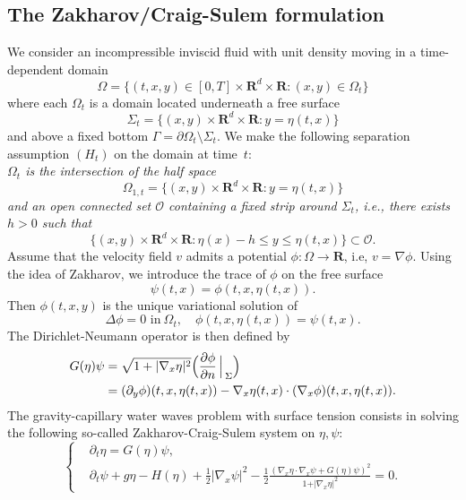 \documentclass[11pt,english]{smfart}
\theoremstyle{plain}
\theoremstyle{definition}
\numberwithin{equation}{section}
\begin{document}
\subsection{The Zakharov/Craig-Sulem formulation}
 We consider an incompressible inviscid fluid with unit density moving in a time-dependent domain  
$$
\Omega = \{(t,x,y) \in[0,T] \times {\mathbf{R}}^d \times {\mathbf{R}}:(x, y)\in \Omega_t\} 
$$
where each $\Omega_t$ is a domain located underneath a free surface 
$$
\Sigma_t = \{(x,y)  \times {\mathbf{R}}^d \times {\mathbf{R}}: y=\eta(t, x)\} 
$$
and above a fixed bottom $\Gamma=\partial\Omega_t\setminus \Sigma_t$. We make the following separation assumption $(H_t)$ on the  domain at time~$t$:\\
{\it
$\Omega_t$ is the intersection of the half space 
\[
\Omega_{1,t}= \{(x,y)  \times {\mathbf{R}}^d \times {\mathbf{R}}: y=\eta(t, x)\} 
\]
and an open connected set $\mathcal{O}$ containing a fixed strip around $\Sigma_t$, i.e., there exists $h>0$ such that 
\begin{equation}\label{sepbot}
 \{(x,y)  \times {\mathbf{R}}^d \times {\mathbf{R}}: \eta(x)-h{\leq} y{\leq}\eta(t, x)\} \subset \mathcal{O}.
\end{equation}
}
{\hspace*{.15in}} Assume that the velocity field $v$ admits a potential $\phi:\Omega \to {\mathbf{R}}$, i.e, $v=\nabla \phi$. Using the  idea of Zakharov, we introduce the trace of $\phi$ on the free surface
$$\psi(t,x)= \phi(t,x,\eta(t,x)).$$ 
 Then $\phi(t, x, y)$ is the unique variational solution of 
\begin{equation}
\Delta\phi =0\text{~in}~\Omega_t,\quad \phi(t, x, \eta(t, x))=\psi(t, x).
\end{equation}
The Dirichlet-Neumann operator is then defined by
\begin{align*}
G(\eta) \psi &= \sqrt{1 + \vert \nabla_x \eta \vert ^2}
\Big( \frac{\partial \phi}{\partial n} \Big \arrowvert_{\Sigma}\Big)\\
&= (\partial_y \phi)(t,x,\eta(t,x)) - \nabla_x \eta(t,x) \cdot(\nabla_x \phi)(t,x,\eta(t,x)).
\end{align*}
The gravity-capillary water waves problem with surface tension consists in solving the following so-called Zakharov-Craig-Sulem system on $\eta,\psi$:
\begin{equation}\label{ww}
\left\{
\begin{aligned}
&\partial_t \eta = G(\eta) \psi,\\
&\partial_t \psi + g\eta-H(\eta)+{\frac{1}{2}} \vert \nabla_x \psi \vert^2 - {\frac{1}{2}} \frac{(\nabla_x \eta \cdot \nabla_x \psi + G(\eta)\psi)^2}{1+ \vert \nabla_x \eta \vert^2}=0.
\end{aligned}
\right.
\end{equation}
\end{document}
